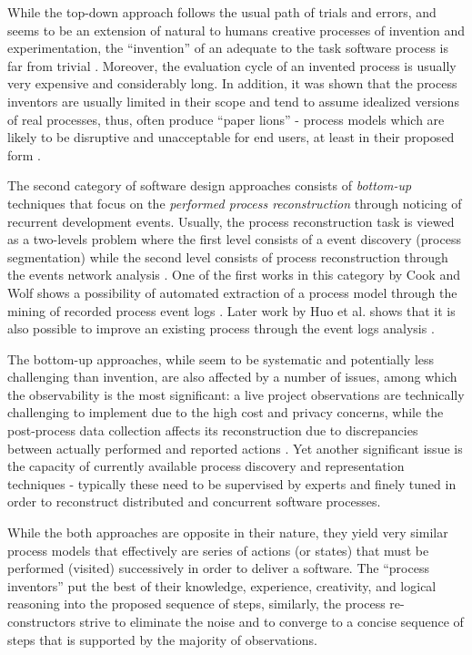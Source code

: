 While the top-down approach follows the usual path of trials and errors, and seems to be an 
extension of natural to humans creative processes of invention and experimentation, 
the ``invention'' of an adequate to the task software process is far from trivial 
\cite{citeulike:5043104} \cite{citeulike:1986013}. 
Moreover, the evaluation cycle of an invented process is usually very expensive and considerably long.
In addition, it was shown that the process inventors are usually limited in their scope and tend to 
assume idealized versions of real processes, thus, often produce ``paper lions'' - process models which are 
likely to be disruptive and unacceptable for end users, at least in their proposed form \cite{citeulike:9758924}.

The second category of software design approaches consists of \textit{bottom-up} techniques that focus 
on the \textit{performed process reconstruction} through noticing of recurrent development events. 
Usually, the process reconstruction task is viewed as a two-levels problem where the first level 
consists of a event discovery (process segmentation) while the second level consists of process 
reconstruction through the events network analysis \cite{citeulike:2703162}.
One of the first works in this category by Cook and Wolf shows a possibility of automated extraction 
of a process model through the mining of recorded process event logs 
\cite{citeulike:328044} \cite{citeulike:5120757} \cite{citeulike:5128143}. 
Later work by Huo et al. shows that it is also possible to improve an existing process
through the event logs analysis \cite{citeulike:7691059} \cite{citeulike:7690766}. 

The bottom-up approaches, while seem to be systematic and potentially less challenging than invention, 
are also affected by a number of issues, among which the observability is the most significant: 
a live project observations are technically challenging to implement due to the high cost and 
privacy concerns, while the post-process data collection affects its reconstruction due to 
discrepancies between actually performed and reported actions \cite{citeulike:7691059}. 
Yet another significant issue is the capacity of currently available process discovery and representation 
techniques - typically these need to be supervised by experts and finely tuned in order to reconstruct 
distributed and concurrent software processes. 

While the both approaches are opposite in their nature, they yield very similar process models that 
effectively are series of actions (or states) that must be performed (visited) successively in order 
to deliver a software. The ``process inventors'' put the best of their knowledge, experience, creativity,
and logical reasoning into the proposed sequence of steps, similarly, the process re-constructors 
strive to eliminate the noise and to converge to a concise sequence of steps that is supported by the 
majority of observations. 


